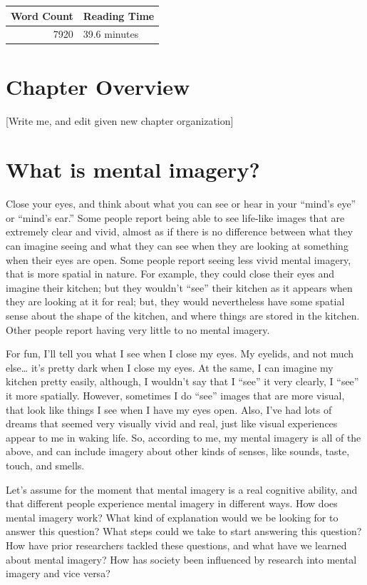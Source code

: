 \documentclass[
  oneside,
  12pt]{crumpbook}
\begin{document}
\begin{tabular}{r|l}
\hline
Word Count & Reading Time\\
\hline
7920 & 39.6 minutes\\
\hline
\end{tabular}

\hypertarget{chapter-overview-1}{%
\section{Chapter Overview}\label{chapter-overview-1}}

{[}Write me, and edit given new chapter organization{]}

\hypertarget{what-is-mental-imagery}{%
\section{What is mental imagery?}\label{what-is-mental-imagery}}

Close your eyes, and think about what you can see or hear in your ``mind's eye'' or ``mind's ear.'' Some people report being able to see life-like images that are extremely clear and vivid, almost as if there is no difference between what they can imagine seeing and what they can see when they are looking at something when their eyes are open. Some people report seeing less vivid mental imagery, that is more spatial in nature. For example, they could close their eyes and imagine their kitchen; but they wouldn't ``see'' their kitchen as it appears when they are looking at it for real; but, they would nevertheless have some spatial sense about the shape of the kitchen, and where things are stored in the kitchen. Other people report having very little to no mental imagery.

For fun, I'll tell you what I see when I close my eyes. My eyelids, and not much else\ldots{} it's pretty dark when I close my eyes. At the same, I can imagine my kitchen pretty easily, although, I wouldn't say that I ``see'' it very clearly, I ``see'' it more spatially. However, sometimes I do ``see'' images that are more visual, that look like things I see when I have my eyes open. Also, I've had lots of dreams that seemed very visually vivid and real, just like visual experiences appear to me in waking life. So, according to me, my mental imagery is all of the above, and can include imagery about other kinds of senses, like sounds, taste, touch, and smells.

Let's assume for the moment that mental imagery is a real cognitive ability, and that different people experience mental imagery in different ways. How does mental imagery work? What kind of explanation would we be looking for to answer this question? What steps could we take to start answering this question? How have prior researchers tackled these questions, and what have we learned about mental imagery? How has society been influenced by research into mental imagery and vice versa?
\end{document}

